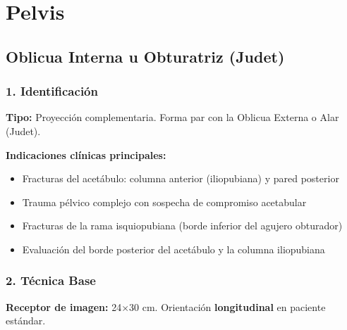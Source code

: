 \twocolumn
\clearpage
	
	
	
	
	\section{Pelvis}
	
	\subsection{Oblicua Interna u Obturatriz (Judet)}
	
	\subsubsection*{1. Identificación}
	
	\textbf{Tipo:} Proyección complementaria. Forma par con la Oblicua Externa o Alar (Judet).
	
	\textbf{Indicaciones clínicas principales:}
	\begin{itemize}
		\item Fracturas del acetábulo: columna anterior (iliopubiana) y pared posterior
		\item Trauma pélvico complejo con sospecha de compromiso acetabular
		\item Fracturas de la rama isquiopubiana (borde inferior del agujero obturador)
		\item Evaluación del borde posterior del acetábulo y la columna iliopubiana
	\end{itemize}
	
	\subsubsection*{2. Técnica Base}
	
	\textbf{Receptor de imagen:} 24$\times$30 cm. Orientación \textbf{longitudinal} en paciente estándar.
	
